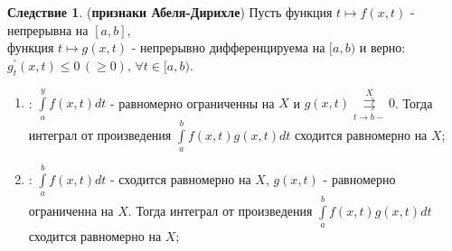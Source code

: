 \documentclass[12pt]{article}
\theoremstyle{definition}
\newtheorem{corollary}{Следствие}
\newcommand{\ddint}[2]{\displaystyle\int\limits_{#1}^{#2}}
\newcommand{\uconvm}[2]{\overset{#1}{\underset{#2}{\rightrightarrows}}}
\begin{document}
\begin{corollary}(\textbf{признаки Абеля-Дирихле}) Пусть функция $t \mapsto f(x,t)$ - непрерывна на $[a,b]$,\\ функция $t \mapsto g(x,t)$ - непрерывно дифференцируема на $[a,b)$ и верно: $g_t^\prime(x,t) \leq 0 \, (\geq 0), \, \forall t \in [a,b)$.
	\begin{enumerate}[label=\arabic*)]
		\item {}: $\ddint{a}{y}f(x,t)dt$ - равномерно ограниченны на $X$ и $g(x,t) \uconvm{X}{t \to b-} 0$. Тогда интеграл от произведения $\ddint{a}{b}f(x,t)g(x,t)dt$  сходится равномерно на $X$;
		\item {}: $\ddint{a}{b}f(x,t)dt$ - сходится равномерно на $X$, $g(x,t)$ - равномерно ограниченна на $X$. Тогда интеграл от произведения $\ddint{a}{b}f(x,t)g(x,t)dt$  сходится равномерно на $X$;
	\end{enumerate}
\end{corollary}
\end{document}
